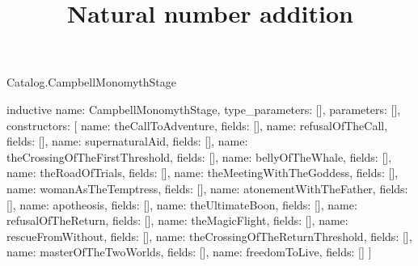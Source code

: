 \begin{lexlean}{Catalog.CampbellMonomythStage}
\title{Natural number addition}
\begin{semanticmodule}
inductive{
  name: CampbellMonomythStage,
  type_parameters: [],
  parameters: [],
  constructors: [
    {name: theCallToAdventure, fields: []},
    {name: refusalOfTheCall, fields: []},
    {name: supernaturalAid, fields: []},
    {name: theCrossingOfTheFirstThreshold, fields: []},
    {name: bellyOfTheWhale, fields: []},
    {name: theRoadOfTrials, fields: []},
    {name: theMeetingWithTheGoddess, fields: []},
    {name: womanAsTheTemptress, fields: []},
    {name: atonementWithTheFather, fields: []},
    {name: apotheosis, fields: []},
    {name: theUltimateBoon, fields: []},
    {name: refusalOfTheReturn, fields: []},
    {name: theMagicFlight, fields: []},
    {name: rescueFromWithout, fields: []},
    {name: theCrossingOfTheReturnThreshold, fields: []},
    {name: masterOfTheTwoWorlds, fields: []},
    {name: freedomToLive, fields: []}
  ]
}
\end{semanticmodule}
\end{lexlean}
